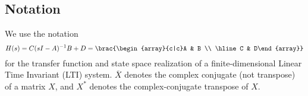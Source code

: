 \documentclass[letterpaper, 10 pt, conference]{ieeeconf}  %
\begin{document}


\subsection{Notation}
We use the notation 
\[
	H(s) = C(sI-A)^{-1} B + D =  \brac{\begin{array}{c|c}A & B \\ \hline C & D\end{array}}
\]
for the transfer function and state space realization of a finite-dimensional Linear Time Invariant (LTI) system. 
\(\overline{X}\) denotes the complex conjugate (not transpose) of  a matrix \(X\), and  \(X^*\) denotes the complex-conjugate transpose of \(X\).  
\end{document}
